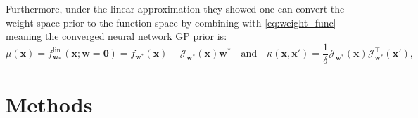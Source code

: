 \documentclass{article}
\makeatletter
\newcommand{\ie}{\textit{i.e.\@}\xspace}
\newcommand{\weights}{\ensuremath{\mathbf{w}}}
\newcommand{\mbf}[1]{\mathbf{#1}}
\newcommand{\vzeros}{\mbf{0}}
\newcommand{\vx}{\mbf{x}}
\newcommand{\vw}{\mbf{w}}
\newcommand{\Jac}[2]{\mathcal{J}_{#1}(#2)}
\newcommand{\JacT}[2]{\mathcal{J}_{#1}^\top(#2)}
\newcommand{\GP}{\mathcal{GP}}
\makeatother
\begin{document}
Furthermore, under the linear approximation they showed one can convert the weight space prior to the function space by combining with \cref{eq:weight_func} meaning the converged neural network GP prior is:
\begin{equation} \label{eq-laplace-approx-function-space}
  \mu(\vx) =  f^{\textrm{lin.}}_{\vw_*}(\vx; \vw = \vzeros) = f_{\vw^*}(\vx) - \Jac{\weights^*}{\mathbf{x}} \vw^* \quad \text{and} \quad
  \kappa(\mathbf{x}, \mathbf{x}')
  = \frac{1}{\delta} \Jac{\weights^*}{\mathbf{x}}\JacT{\weights^*}{\mathbf{x}'},
\end{equation}
%

\section{Methods}
\end{document}
